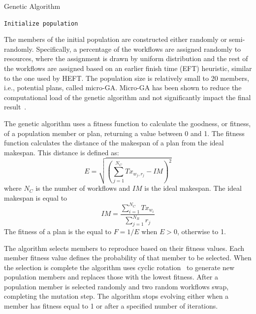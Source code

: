 \begin{algorithm}[t]
    \caption{Genetic Algorithm}
    \label{alg:gen_algo}
    \scriptsize
    \begin{algorithmic}[1]
        \State \texttt{Initialize population}
        \EndWhile
        \EndProcedure
    \end{algorithmic}
\end{algorithm}

The members of the initial population are constructed either randomly or
semi-randomly. Specifically, a percentage of the workflows are assigned
randomly to resources, where the assignment is drawn by uniform distribution
and the rest of the workflows are assigned based on an earlier finish time
(EFT) heuristic, similar to the one used by HEFT. The population size is
relatively small to 20 members, i.e., potential plans, called micro-GA.
Micro-GA has been shown to reduce the computational load of the genetic
algorithm and not significantly impact the final
result~\cite{zomaya2001observations}.

The genetic algorithm uses a fitness function to calculate the goodness, or
fitness, of a population member or plan, returning a value between 0 and 1.
The fitness function calculates the distance of the makespan of a plan from
the ideal makespan. This distance is defined as:
\begin{equation}
E = \sqrt{(\sum_{j=1}^{N_{C}}Tx_{w_{j},r_{j}} - IM)^2}
\label{eq:fitness}
\end{equation}
where $N_{C}$ is the number of workflows and $IM$ is the ideal makespan. The
ideal makespan is equal to
\begin{equation}
IM = \frac{\sum_{i=1}^{N_{C}}Tx_{w_{i}}}{\sum_{j=1}^{N_{R}}r_{j}}
\label{eq:ideal_fitness}
\end{equation}
The fitness of a plan is the equal to $F = 1 /E$ when $E > 0$, otherwise to 1.

The algorithm selects members to reproduce based on their fitness values. Each
member fitness value defines the probability of that member to be selected.
When the selection is complete the algorithm uses cyclic
rotation~\cite{oliver1987study} to generate new population members and
replaces those with the lowest fitness. After a population member is selected
randomly and two random workflows swap, completing the mutation step. The
algorithm stops evolving either when a member has fitness equal to 1 or after
a specified number of iterations.

